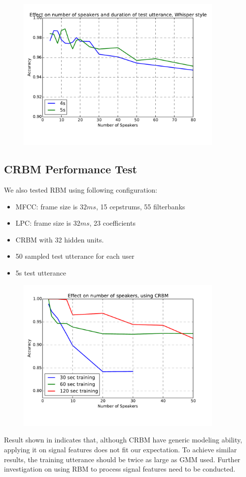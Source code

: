 \begin{figure}[H]
  \centering
  \includegraphics[width=0.9\textwidth]{img/whisper.pdf}
\end{figure}

\subsection{CRBM Performance Test}
We also tested RBM using following configuration:
\begin{itemize}
  \item MFCC: frame size is $32 ms $, 15 cepstrums, 55 filterbanks
  \item LPC: frame size is $32 ms $, 23 coefficients
  \item CRBM with 32 hidden units.
  \item 50 sampled test utterance for each user
  \item 5s test utterance
\end{itemize}

\begin{figure}[H]
  \centering
  \includegraphics[width=0.9\textwidth]{img/crbm.pdf}
  \caption{\label{fig:crbmresult}}
\end{figure}

Result shown in  indicates that, although CRBM have
generic modeling ability, applying it on signal features does not fit
our expectation. To achieve similar results, the training utterance should
be twice as large as GMM used. Further investigation on using RBM to
process signal features need to be conducted.


